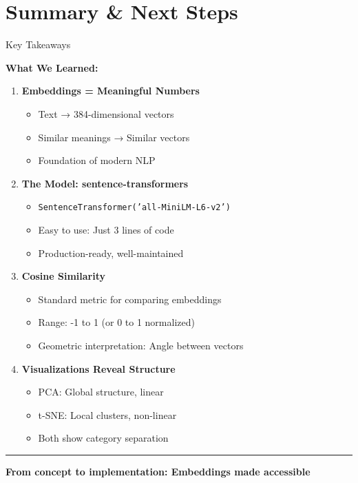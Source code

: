 \documentclass[8pt,aspectratio=169]{beamer}
\newcommand{\bottomnote}[1]{%
\vfill
\vspace{-2mm}
\textcolor{mllavender2}{\rule{\textwidth}{0.4pt}}
\vspace{1mm}
\footnotesize
\textbf{#1}
}
\begin{document}
\section{Summary \& Next Steps}

\begin{frame}[t]{Key Takeaways}

\textbf{What We Learned:}

\vspace{0.5cm}

\begin{enumerate}
    \item \textbf{Embeddings = Meaningful Numbers}
    \begin{itemize}
        \item Text → 384-dimensional vectors
        \item Similar meanings → Similar vectors
        \item Foundation of modern NLP
    \end{itemize}

    \vspace{0.3cm}

    \item \textbf{The Model: sentence-transformers}
    \begin{itemize}
        \item \texttt{SentenceTransformer('all-MiniLM-L6-v2')}
        \item Easy to use: Just 3 lines of code
        \item Production-ready, well-maintained
    \end{itemize}

    \vspace{0.3cm}

    \item \textbf{Cosine Similarity}
    \begin{itemize}
        \item Standard metric for comparing embeddings
        \item Range: -1 to 1 (or 0 to 1 normalized)
        \item Geometric interpretation: Angle between vectors
    \end{itemize}

    \vspace{0.3cm}

    \item \textbf{Visualizations Reveal Structure}
    \begin{itemize}
        \item PCA: Global structure, linear
        \item t-SNE: Local clusters, non-linear
        \item Both show category separation
    \end{itemize}
\end{enumerate}

\bottomnote{From concept to implementation: Embeddings made accessible}
\end{frame}
\end{document}
